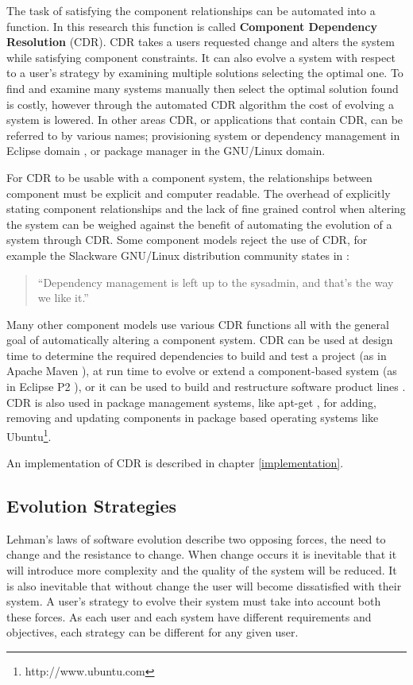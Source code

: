 The task of satisfying the component relationships can be automated into a function.
In this research this function is called \textbf{Component Dependency Resolution} (CDR).
CDR takes a users requested change and alters the system while satisfying component constraints.
It can also evolve a system with respect to a user's strategy by examining multiple solutions selecting the optimal one.
To find and examine many systems manually then select the optimal solution found is costly, however through the automated CDR algorithm the cost of evolving a system is lowered.
In other areas CDR, or applications that contain CDR, can be referred to by various names; provisioning system or dependency management in Eclipse domain \citep{leBerre2010},
or package manager in the GNU/Linux \citep{Barth2005} domain.

For CDR to be usable with a component system, the relationships between component must be explicit and computer readable.
The overhead of explicitly stating component relationships and the lack of fine grained control when altering the system
can be weighed against the benefit of automating the evolution of a system through CDR.
Some component models reject the use of CDR, 
for example the Slackware GNU/Linux distribution community states in \citep{Lumens2000}:
\begin{quote}
``Dependency management is left up to the sysadmin, and that's the way we like it.''
\end{quote}
Many other component models use various CDR functions all with the general goal of automatically altering a component system.
CDR can be used at design time to determine the required dependencies to build and test a project (as in Apache Maven \citep{casey_better_2008}),
at run time to evolve or extend a component-based system (as in Eclipse P2 \citep{leBerre2010}),
or it can be used to build and restructure software product lines \citep{savolainen_analyzing_2007}.
CDR is also used in package management systems, like apt-get \citep{Barth2005},
for adding, removing and updating components in package based operating systems like Ubuntu\footnote{http://www.ubuntu.com}. 

An implementation of CDR is described in chapter \ref{implementation}.

\subsection{Evolution Strategies}
Lehman's laws of software evolution \citep{lehman1980,lehman1997} describe two opposing forces,
the need to change and the resistance to change.
When change occurs it is inevitable that it will introduce more complexity and the quality of the system will be reduced.
It is also inevitable that without change the user will become dissatisfied with their system.
A user's strategy to evolve their system must take into account both these forces.
As each user and each system have different requirements and objectives, each strategy can be different for any given user.


